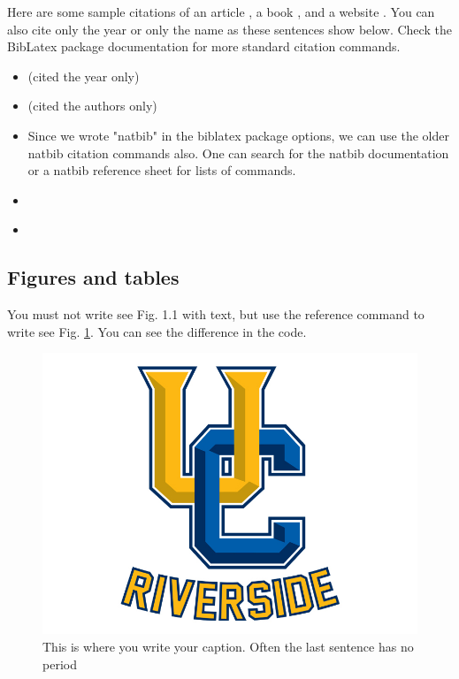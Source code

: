 Here are some sample citations of an article \parencite{ezcurra2016coastal}, a book \parencite{felger1985people}, and a website \parencite{pew2015internettime}. You can also cite only the year or only the name as these sentences show below. Check the BibLatex package documentation for more standard citation commands.
\begin{itemize}
    \item \citeyear{ezcurra2016coastal} (cited the year only)
    \item \citeauthor{felger1985people} (cited the authors only)
    \item Since we wrote "natbib" in the biblatex package options, we can use the older natbib citation commands also. One can search for the natbib documentation or a natbib reference sheet for lists of commands.
    \item \citet{ezcurra2016coastal}
    \item \citealp{felger1985people}
\end{itemize}

\subsection{Figures and tables}

You must not write see Fig. 1.1 with text, but use the reference command to write see Fig. \ref{fig:1.1}. You can see the difference in the code.
\begin{figure}[H] %
\centering
\includegraphics[scale = 0.3] {images/ucr}
\caption{This is where you write your caption. Often the last sentence has no period} 
\label{fig:1.1}
\end{figure}


